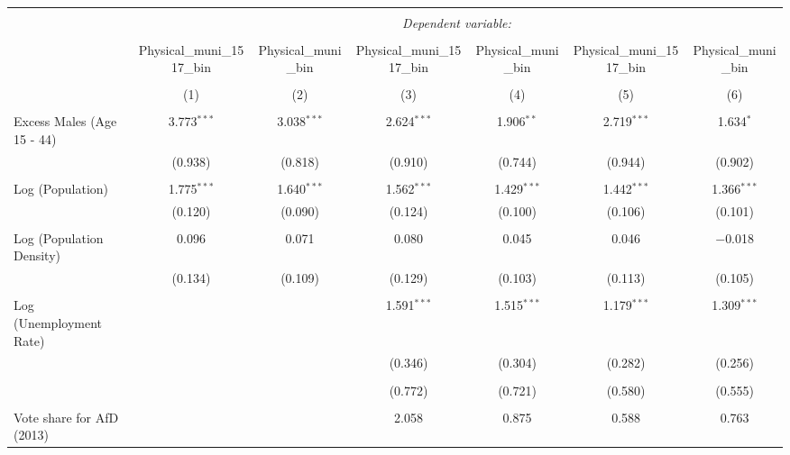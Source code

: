 
\begin{table}[!htbp] \centering 
  \caption{} 
  \label{} 
\begin{tabular}{@{\extracolsep{5pt}}lcccccc} 
\\[-1.8ex]\hline 
\hline \\[-1.8ex] 
 & \multicolumn{6}{c}{\textit{Dependent variable:}} \\ 
\cline{2-7} 
\\[-1.8ex] & Physical\_muni\_1517\_bin & Physical\_muni\_bin & Physical\_muni\_1517\_bin & Physical\_muni\_bin & Physical\_muni\_1517\_bin & Physical\_muni\_bin \\ 
\\[-1.8ex] & (1) & (2) & (3) & (4) & (5) & (6)\\ 
\hline \\[-1.8ex] 
 Excess Males (Age 15 - 44) & 3.773$^{***}$ & 3.038$^{***}$ & 2.624$^{***}$ & 1.906$^{**}$ & 2.719$^{***}$ & 1.634$^{*}$ \\ 
  & (0.938) & (0.818) & (0.910) & (0.744) & (0.944) & (0.902) \\ 
  & & & & & & \\ 
 Log (Population) & 1.775$^{***}$ & 1.640$^{***}$ & 1.562$^{***}$ & 1.429$^{***}$ & 1.442$^{***}$ & 1.366$^{***}$ \\ 
  & (0.120) & (0.090) & (0.124) & (0.100) & (0.106) & (0.101) \\ 
  & & & & & & \\ 
 Log (Population Density) & 0.096 & 0.071 & 0.080 & 0.045 & 0.046 & $-$0.018 \\ 
  & (0.134) & (0.109) & (0.129) & (0.103) & (0.113) & (0.105) \\ 
  & & & & & & \\ 
 Log (Unemployment Rate) &  &  & 1.591$^{***}$ & 1.515$^{***}$ & 1.179$^{***}$ & 1.309$^{***}$ \\ 
  &  &  & (0.346) & (0.304) & (0.282) & (0.256) \\ 
  & & & & & & \\ 
  &  &  & (0.772) & (0.721) & (0.580) & (0.555) \\ 
  & & & & & & \\ 
 Vote share for AfD (2013) &  &  & 2.058 & 0.875 & 0.588 & 0.763 \\ 

\end{tabular}
\end{table}

